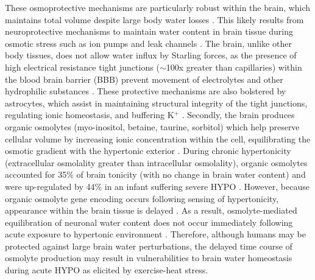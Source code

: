 These osmoprotective mechanisms are particularly robust within the brain, which maintains total volume despite large body water losses \cite{nose_distribution_1983,cipolla_cerebral_2009}. This likely results from neuroprotective mechanisms to maintain water content in brain tissue during osmotic stress such as ion pumps and leak channels \cite{cipolla_cerebral_2009,cserr_extracellular_1991}. The brain, unlike other body tissues, does not allow water influx by Starling forces, as the presence of high electrical resistance tight junctions (${\sim}$100x greater than capillaries) within the blood brain barrier (BBB) prevent movement of electrolytes and other hydrophilic substances \cite{kimelberg_water_2004,cipolla_cerebral_2009,ropper_hyperosmolar_2012,bain_cerebral_2015}. These protective mechanisms are also bolstered by astrocytes, which assist in maintaining structural integrity of the tight junctions, regulating ionic homeostasis, and buffering K${^+}$ \cite{cipolla_cerebral_2009}. Secondly, the brain produces organic osmolytes (myo-inositol, betaine, taurine, sorbitol) which help preserve cellular volume by increasing ionic concentration within the cell, equilibrating the osmotic gradient with the hypertonic exterior \cite{de_petris_cell_2001,weed_pressure_1919}. During chronic hypertonicity (extracellular osmolality greater than intracellular osmolality), organic osmolytes accounted for 35\% of brain tonicity (with no change in brain water content) \cite{lien_effects_1990} and were up-regulated by 44\% in an infant suffering severe HYPO \cite{lee_organic_1994}. However, because organic osmolyte gene encoding occurs following sensing of hypertonicity, appearance within the brain tissue is delayed \cite{de_petris_cell_2001, gullans_control_1993}. As a result, osmolyte-mediated equilibration of neuronal water content does not occur immediately following acute exposure to hypertonic environment \cite{ayus_effects_1996}. Therefore, although humans may be protected against large brain water perturbations, the delayed time course of osmolyte production may result in vulnerabilities to brain water homeostasis during acute HYPO as elicited by exercise-heat stress. 


